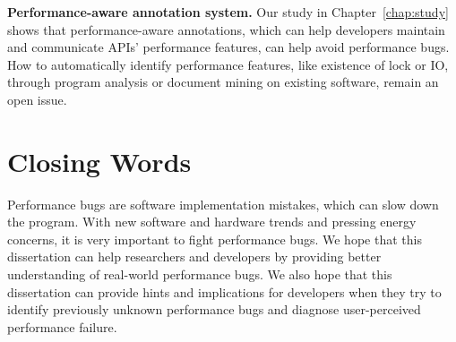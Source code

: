 {\bf Performance-aware annotation system.}
Our study in Chapter~\ref{chap:study} shows that performance-aware annotations, 
which can help developers maintain and communicate APIs' performance features, 
can help avoid performance bugs. 
How to automatically identify performance features, 
like existence of lock or IO, 
through program analysis or document mining on existing software, remain an open issue. 


\section{Closing Words}
Performance bugs are software implementation mistakes, which can slow down the program. 
With new software and hardware trends and pressing energy concerns, it is very important to fight performance bugs. 
We hope that this dissertation can help researchers and developers 
by providing better understanding of real-world performance bugs. 
We also hope that this dissertation can provide hints 
and implications for developers when they try to identify previously unknown performance bugs 
and diagnose user-perceived performance failure. 
